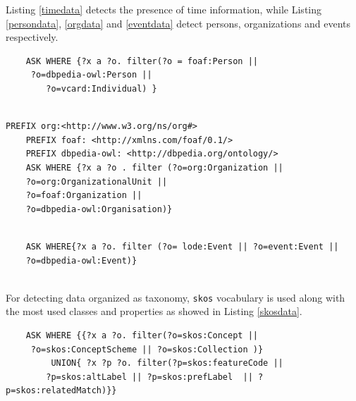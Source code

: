 Listing \ref{timedata} detects the presence of time information, while Listing \ref{persondata}, \ref{orgdata} and \ref{eventdata} detect persons, organizations and events respectively.

\begin{lstlisting}
	ASK WHERE {?x a ?o. filter(?o = foaf:Person ||
	 ?o=dbpedia-owl:Person ||
		?o=vcard:Individual) }
	
\end{lstlisting}

\begin{lstlisting}
PREFIX org:<http://www.w3.org/ns/org#>
	PREFIX foaf: <http://xmlns.com/foaf/0.1/> 
	PREFIX dbpedia-owl: <http://dbpedia.org/ontology/> 
	ASK WHERE {?x a ?o . filter (?o=org:Organization || 
	?o=org:OrganizationalUnit || 
	?o=foaf:Organization || 
	?o=dbpedia-owl:Organisation)}
	
\end{lstlisting}	

\begin{lstlisting}
    ASK WHERE{?x a ?o. filter (?o= lode:Event || ?o=event:Event || 
    ?o=dbpedia-owl:Event)}	
    
  \end{lstlisting}
  
  
For detecting data organized as taxonomy, \texttt{skos} vocabulary is used along with the most used classes and properties as showed in Listing \ref{skosdata}.

\begin{lstlisting}
    ASK WHERE {{?x a ?o. filter(?o=skos:Concept ||
     ?o=skos:ConceptScheme || ?o=skos:Collection )}
    	 UNION{ ?x ?p ?o. filter(?p=skos:featureCode || 
    	?p=skos:altLabel || ?p=skos:prefLabel  || ?p=skos:relatedMatch)}}		
\end{lstlisting}


